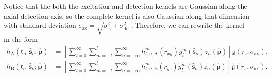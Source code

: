 \documentclass[11pt]{article}
\providecommand{\mb}[1]{\mathbf{#1}}
\providecommand{\ro}{\mathbf{\mathfrak{r}}_o}
\providecommand{\so}{\mathbf{\hat{s}}_o}
\providecommand{\mh}[1]{\mathbf{\hat{#1}}}
\providecommand{\tx}[1]{\text{#1}}
\providecommand{\fig}[4]{
\begin{figure}[h]
 \captionsetup{width=1.0\linewidth}
 \centering
 \texttt{[image: \#1]}
 \caption{#3}
 \label{fig:#4}
\end{figure}
}
\begin{document}
Notice that the both the excitation and detection kernels are Gaussian along the
axial detection axis, so the complete kernel is also Gaussian along that
dimension with standard deviation
$\sigma_{\tx{ax}} = \sqrt{\sigma_{\tx{ls}}^2 + \sigma_{\tx{det}}^2}$. Therefore,
we can rewrite the kernel in the form
\begin{align}
  h_{\tx{A}}(\ro, \so; \mh{p}) &= \left[\sum_{l=0}^{\infty}\sum_{m=-l}^l\sum_{n=-\infty}^{\infty} h_{l,n,\tx{A}}^{m}(r_{xy})y_l^m(\so)z_n(\mh{p})\right]\mathfrak{g}(r_z, \sigma_{\tx{ax}}),\\
  h_{\tx{B}}(\ro, \so; \mh{p}) &= \left[\sum_{l=0}^{\infty}\sum_{m=-l}^l\sum_{n=-\infty}^{\infty} h_{l,n, \tx{B}}^{m}(r_{yz})y_l^m(\so)z_n(\mh{p})\right]\mathfrak{g}(r_x, \sigma_{\tx{ax}}).
\end{align}


\end{document}
